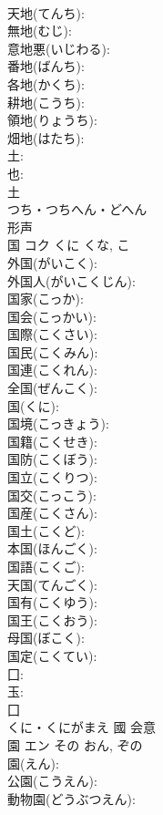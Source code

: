 \documentclass[8pt]{extreport}
\begin{document}
\begin{CJK}{UTF8}{min}
\\	天地(てんち): 
\\	無地(むじ): 
\\	意地悪(いじわる): 
\\	番地(ばんち): 
\\	各地(かくち): 
\\	耕地(こうち): 
\\	領地(りょうち): 
\\	畑地(はたち): 
\\	土: 
\\	也: 
\\	土	
\\	つち・つちへん・どへん	
\\	形声 
\\	国	コク	くに	くな, こ	
\\	外国(がいこく): 
\\	外国人(がいこくじん): 
\\	国家(こっか): 
\\	国会(こっかい): 
\\	国際(こくさい): 
\\	国民(こくみん): 
\\	国連(こくれん): 
\\	全国(ぜんこく): 
\\	国(くに): 
\\	国境(こっきょう): 
\\	国籍(こくせき): 
\\	国防(こくぼう): 
\\	国立(こくりつ): 
\\	国交(こっこう): 
\\	国産(こくさん): 
\\	国土(こくど): 
\\	本国(ほんごく): 
\\	国語(こくご): 
\\	天国(てんごく): 
\\	国有(こくゆう): 
\\	国王(こくおう): 
\\	母国(ぼこく): 
\\	国定(こくてい): 
\\	囗: 
\\	玉: 
\\	囗	
\\	くに・くにがまえ	國	会意 
\\	園	エン	その	おん, ぞの	
\\	園(えん): 
\\	公園(こうえん): 
\\	動物園(どうぶつえん): 

\end{CJK}
\end{document}
